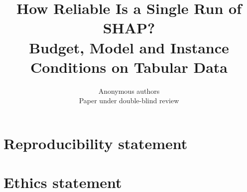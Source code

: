 \documentclass{article}
\title{How Reliable Is a Single Run of SHAP? \\ Budget, Model and Instance Conditions on Tabular Data}
\author{Anonymous authors\\Paper under double-blind review}
\begin{document}
\maketitle

\begin{abstract}

\end{abstract}







\section*{Reproducibility statement}


\section*{Ethics statement}







\appendix

\end{document}
